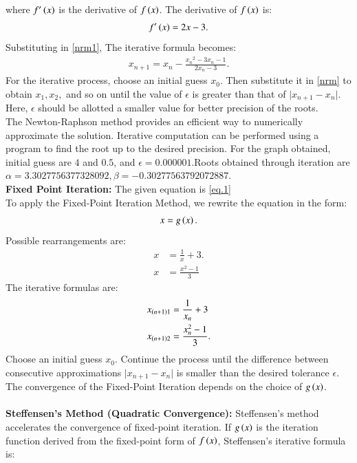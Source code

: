 \documentclass[journal,12pt,onecolumn]{IEEEtran}
\theoremstyle{remark}
\begin{document}
where $ f^\prime\left(x\right) $ is the derivative of $f\left(x\right) $.
The derivative of $f\left(x\right)$ is:
\begin{align}
f^\prime\left(x\right) = 2x-3.
\end{align}
Substituting in \ref{nrm1}, The iterative formula becomes:
\begin{align}
x_{n+1} = x_n - \frac{{x_n}^2 - 3x_n - 1 }{2x_n-3}.\label{nrm}
\end{align}
For the iterative process, choose an initial guess $ x_0 $. Then substitute it in \ref{nrm} to obtain $x_1,x_2,$ and so on until the value of $\epsilon$ is greater than that of $ \lvert x_{n+1} - x_n\rvert $. Here, $\epsilon$ should be allotted a smaller value for better precision of the roots.\\
The Newton-Raphson method provides an efficient way to numerically approximate the solution. Iterative computation can be performed using a program to find the root up to the desired precision. For the graph obtained, initial guess are $4$ and $0.5$, and $\epsilon=0.000001$.Roots obtained through iteration are $\alpha=3.3027756377328092,\beta=-0.30277563792072887.$\\
\textbf{Fixed Point Iteration:}
The given equation is \ref{eq.1}\\
To apply the Fixed-Point Iteration Method, we rewrite the equation in the form:
\begin{align}
x = g\left(x\right).\label{fim}
\end{align}
Possible rearrangements are:
\begin{align}
x &= \frac{1}{x} + 3.\\
x&= \frac{x^2 -1}{3}
\end{align}
The iterative formulas are:
\begin{align}
x_{\left(n+1\right)1} &= \frac{1}{x_n} + 3\\
x_{\left(n+1\right)2} &= \frac{x_n^2 -1}{3}.
\end{align}
Choose an initial guess $x_0$. Continue the process until the difference between consecutive approximations $ \lvert x_{n+1} - x_n\rvert $ is smaller than the desired tolerance $\epsilon$. The convergence of the Fixed-Point Iteration depends on the choice of $ g\left(x\right) $. \\\\
\textbf{Steffensen's Method (Quadratic Convergence):}
Steffensen's method accelerates the convergence of fixed-point iteration. If $ g\left(x\right) $ is the iteration function derived from the fixed-point form of $ f\left(x\right) $, Steffensen's iterative formula is:
\end{document}
